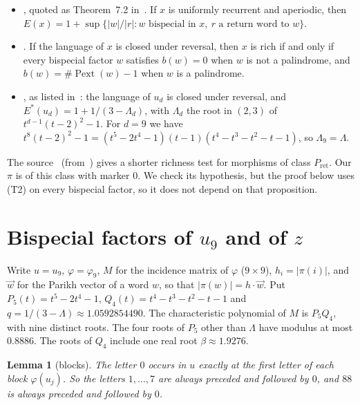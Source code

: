\documentclass[11pt]{article}
\newtheorem{lemma}[theorem]{Lemma}
\theoremstyle{remark}
\newcommand{\Pext}{\operatorname{Pext}}
\begin{document}
\begin{itemize}
\item[(T1)] \cite[Theorem~3]{ddp}, quoted as Theorem~7.2 in~\cite{dmp}. If $x$ is
uniformly recurrent and aperiodic, then
$E(x)=1+\sup\{|w|/|r| : w \text{ bispecial in } x,\ r \text{ a return word to } w\}$.
\item[(T2)] \cite[Theorem~4]{dp-limit}. If the language of $x$ is closed under reversal,
then $x$ is rich if and only if every bispecial factor $w$ satisfies $b(w)=0$ when $w$ is
not a palindrome, and $b(w)=\#\Pext(w)-1$ when $w$ is a palindrome.
\item[(T3)] \cite{dkp}, as listed in~\cite[Section~2]{dp-limit}: the language of $u_d$
is closed under reversal, and $E^*(u_d)=1+1/(3-\Lambda_d)$, with $\Lambda_d$ the root in
$(2,3)$ of $t^{d-1}(t-2)^2-1$. For $d=9$ we have
$t^8(t-2)^2-1=(t^5-2t^4-1)(t-1)(t^4-t^3-t^2-t-1)$, so $\Lambda_9=\Lambda$.
\end{itemize}

The source~\cite[Proposition~7.4]{dmp} (from~\cite[Proposition~19]{dp-limit}) gives a
shorter richness test for morphisms of class $P_{\mathrm{ret}}$. Our $\pi$ is of this
class with marker $0$. We check its hypothesis, but the proof below uses (T2) on every
bispecial factor, so it does not depend on that proposition.

\section{\texorpdfstring{Bispecial factors of $u_9$ and of $z$}{Bispecial factors of u9 and of z}}\label{sec:proof}

Write $u=u_9$, $\varphi=\varphi_9$, $M$ for the incidence matrix of $\varphi$ ($9\times9$),
$h_i=|\pi(i)|$, and $\vec w$ for the Parikh vector of a word $w$, so that
$|\pi(w)|=h\cdot\vec w$. Put $P_5(t)=t^5-2t^4-1$, $Q_4(t)=t^4-t^3-t^2-t-1$ and
$q=1/(3-\Lambda)\approx1.0592854490$. The characteristic polynomial of $M$ is
$P_5Q_4$, with nine distinct roots. The four roots of $P_5$ other than $\Lambda$ have
modulus at most $0.8886$. The roots of $Q_4$ include one real root
$\beta\approx1.9276$.

\begin{lemma}[blocks]\label{lem:blocks}
The letter $0$ occurs in $u$ exactly at the first letter of each block $\varphi(u_j)$.
So the letters $1,\dots,7$ are always preceded and followed by $0$, and $88$ is always
preceded and followed by $0$.
\end{lemma}
\end{document}
